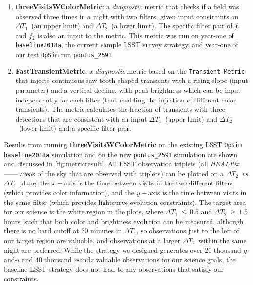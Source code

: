 \documentclass[letterpaper,longauthor,trackchanges,twocolumn,onecolappendix,sort&compress]{aastex62}
\newcommand{\dtone}{\ensuremath{\Delta T_1}}
\newcommand{\dttwo}{\ensuremath{\Delta T_2}}
\begin{document}
\begin{enumerate}
\item
{\bf threeVisitsWColorMetric}: a {\it diagnostic} metric that checks if a field was observed three times in a night with two filters, given input constraints on \dtone\ (an upper limit) and \dttwo\ (a lower limit). The specific filter pair of $f_1$ and $f_2$ is also an input to the metric. This metric was run on year-one of {\tt baseline2018a}, the current sample LSST survey strategy, and year-one of our test {\tt OpSim} run {\tt pontus\_2591}. 
\item
{\bf FastTransientMetric}: a {\it diagnostic} metric based on the {\tt Transient Metric} that injects continuous saw-tooth shaped transients with a rising slope (input parameter) and a vertical decline, with peak brightness which can be input independently for each filter (thus enabling the injection of different color transients). The metric calculates the fraction of transients with three detections that are consistent with an input \dtone\ (upper limit) and \dttwo\ (lower limit) and a specific filter-pair.

\end{enumerate}
Results from running {\bf threeVisitsWColorMetric} on the existing LSST {\tt OpSim baseline2018a} simulation and on the new {\tt pontus\_2591} simulation are shown and discussed in \autoref{fig:metricresult}. All LSST observation triplets (all \emph{HEALPix} ---\citealt{Gorski05}--- areas of the sky that are observed with triplets) can be plotted on a \dttwo\ \emph{vs} \dtone\ plane: the $x-$axis is the time between visits in the two different filters (which provides color information), and the $y-$axis is the time between visits in the same filter (which provides lightcurve evolution constraints). The target area for our science is the white region in the plots, where $\dtone~\leq~0.5$ and $\dttwo~\geq~1.5$ hours, such that both color and brightness evolution can be measured, although there is no hard cutoff at 30 minutes in \dtone, so observations just to the left of our target region are valuable, and observations at a larger \dttwo\ within the same night are preferred. While the strategy we designed generates over 20 thousand $g$-and-$i$ and 40 thousand $r$-and$z$ valuable observations for our science goals, the baseline LSST strategy does not lead to any observations that satisfy our constraints.
\end{document}
